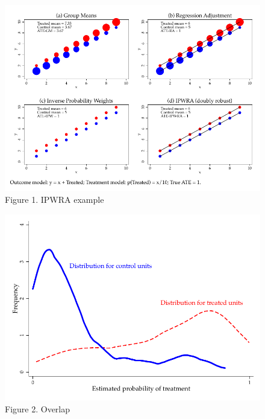 \documentclass[12pt]{article}
\begin{document}
\begin{figure}[h]\centering
\caption{Figure 1. IPWRA example}
    \includegraphics{figure1.pdf}
\end{figure}

\begin{figure}[h]\centering
\caption{Figure 2. Overlap}
    \includegraphics{figure2.pdf}
\end{figure}
\end{document}
